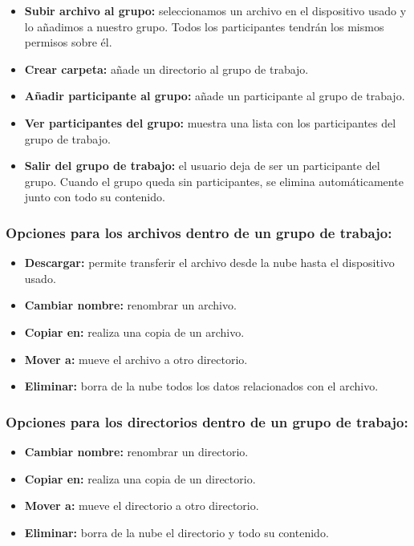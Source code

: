 \begin{itemize}
	\item \textbf{Subir archivo al grupo:} seleccionamos un archivo en el dispositivo usado y lo añadimos a nuestro grupo. Todos los participantes tendrán los mismos permisos sobre él.
	\item \textbf{Crear carpeta:} añade un directorio al grupo de trabajo.
	\item \textbf{Añadir participante al grupo:} añade un participante al grupo de trabajo.
	\item \textbf{Ver participantes del grupo:} muestra una lista con los participantes del grupo de trabajo.
	\item \textbf{Salir del grupo de trabajo:} el usuario deja de ser un participante del grupo. Cuando el grupo queda sin participantes, se elimina automáticamente junto con todo su contenido.
\end{itemize}

\subsubsection{Opciones para los archivos dentro de un grupo de trabajo:}
\begin{itemize}
	\item \textbf{Descargar:} permite transferir el archivo desde la nube hasta el dispositivo usado.
	\item \textbf{Cambiar nombre:} renombrar un archivo.
	\item \textbf{Copiar en:} realiza una copia de un archivo.
	\item \textbf{Mover a:} mueve el archivo a otro directorio.
	\item \textbf{Eliminar:} borra de la nube todos los datos relacionados con el archivo.
\end{itemize}

\subsubsection{Opciones para los directorios dentro de un grupo de trabajo:}
\begin{itemize}
	\item \textbf{Cambiar nombre:} renombrar un directorio.
	\item \textbf{Copiar en:} realiza una copia de un directorio.
	\item \textbf{Mover a:} mueve el directorio a otro directorio.
	\item \textbf{Eliminar:} borra de la nube el directorio y todo su contenido.
\end{itemize} 

